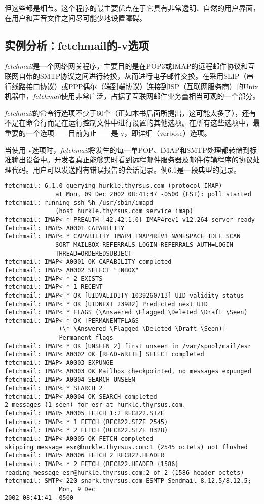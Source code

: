 \documentclass[12pt,oneside]{book}
\begin{document}
\begin{common-format}
但这些都是细节。这个程序的最主要优点在于它具有非常透明、自然的用户界面，在用户和声音文件之间尽可能少地设置障碍。

\subsection{实例分析：fetchmail的-v选项}
\textit{fetchmail}是一个网络网关程序，主要目的是在POP3或IMAP的远程邮件协议和互联网自带的SMTP协议之间进行转换，从而进行电子邮件交换。在采用SLIP（串行线路接口协议）或PPP偶尔（端到端协议）连接到ISP（互联网服务商）的Unix机器中，\textit{fetchmail}使用非常广泛，占据了互联网邮件业务量相当可观的一个部分。

\textit{fetchmail}的命令行选项不少于60个（正如本书后面所提出，这可能太多了），还有不是在命令行而是在运行控制文件中进行设置的其他选项。在所有这些选项中，最重要的一个选项——目前为止——是-v，即详细（verbose）选项。

当使用-v选项时，\textit{fetchmail}将发生的每一单POP、IMAP和SMTP处理都转储到标准输出设备中。开发者真正能够实时看到远程邮件服务器及邮件传输程序的协议处理代码。用户可以发送附有错误报告的会话记录。例6.1是一段典型的记录。


\begin{Verbatim}[label=例6.1  fetchmail的-v记录实例]
fetchmail: 6.1.0 querying hurkle.thyrsus.com (protocol IMAP) 
              at Mon, 09 Dec 2002 08:41:37 -0500 (EST): poll started
fetchmail: running ssh %h /usr/sbin/imapd 
              (host hurkle.thyrsus.com service imap)
fetchmail: IMAP< * PREAUTH [42.42.1.0] IMAP4rev1 v12.264 server ready
fetchmail: IMAP> A0001 CAPABILITY
fetchmail: IMAP< * CAPABILITY IMAP4 IMAP4REV1 NAMESPACE IDLE SCAN 
              SORT MAILBOX-REFERRALS LOGIN-REFERRALS AUTH=LOGIN 
              THREAD=ORDEREDSUBJECT
fetchmail: IMAP< A0001 OK CAPABILITY completed
fetchmail: IMAP> A0002 SELECT "INBOX"
fetchmail: IMAP< * 2 EXISTS
fetchmail: IMAP< * 1 RECENT
fetchmail: IMAP< * OK [UIDVALIDITY 1039260713] UID validity status
fetchmail: IMAP< * OK [UIDNEXT 23982] Predicted next UID
fetchmail: IMAP< * FLAGS (\Answered \Flagged \Deleted \Draft \Seen)
fetchmail: IMAP< * OK [PERMANENTFLAGS 
               (\* \Answered \Flagged \Deleted \Draft \Seen)] 
               Permanent flags
fetchmail: IMAP< * OK [UNSEEN 2] first unseen in /var/spool/mail/esr
fetchmail: IMAP< A0002 OK [READ-WRITE] SELECT completed
fetchmail: IMAP> A0003 EXPUNGE
fetchmail: IMAP< A0003 OK Mailbox checkpointed, no messages expunged
fetchmail: IMAP> A0004 SEARCH UNSEEN
fetchmail: IMAP< * SEARCH 2
fetchmail: IMAP< A0004 OK SEARCH completed
2 messages (1 seen) for esr at hurkle.thyrsus.com.
fetchmail: IMAP> A0005 FETCH 1:2 RFC822.SIZE
fetchmail: IMAP< * 1 FETCH (RFC822.SIZE 2545)
fetchmail: IMAP< * 2 FETCH (RFC822.SIZE 8328)
fetchmail: IMAP< A0005 OK FETCH completed
skipping message esr@hurkle.thyrsus.com:1 (2545 octets) not flushed
fetchmail: IMAP> A0006 FETCH 2 RFC822.HEADER
fetchmail: IMAP< * 2 FETCH (RFC822.HEADER {1586}
reading message esr@hurkle.thyrsus.com:2 of 2 (1586 header octets)
fetchmail: SMTP< 220 snark.thyrsus.com ESMTP Sendmail 8.12.5/8.12.5; 
               Mon, 9 Dec
2002 08:41:41 -0500


\end{Verbatim}
\end{common-format}
\end{document}
